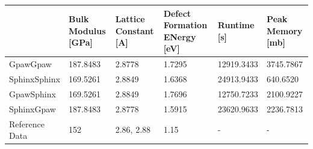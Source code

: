 \begin{tabular}{llllll}
\toprule
 & Bulk Modulus [GPa] & Lattice Constant [A] & Defect Formation ENergy [eV] & Runtime [s] & Peak Memory [mb] \\
\midrule
GpawGpaw & 187.8483 & 2.8778 & 1.7295 & 12919.3433 & 3745.7867 \\
SphinxSphinx & 169.5261 & 2.8849 & 1.6368 & 24913.9433 & 640.6520 \\
GpawSphinx & 169.5261 & 2.8849 & 1.7696 & 12750.7233 & 2100.9227 \\
SphinxGpaw & 187.8483 & 2.8778 & 1.5915 & 23620.9633 & 2236.7813 \\
Reference Data & 152 & 2.86, 2.88 & 1.15 & - & - \\
\bottomrule
\end{tabular}
